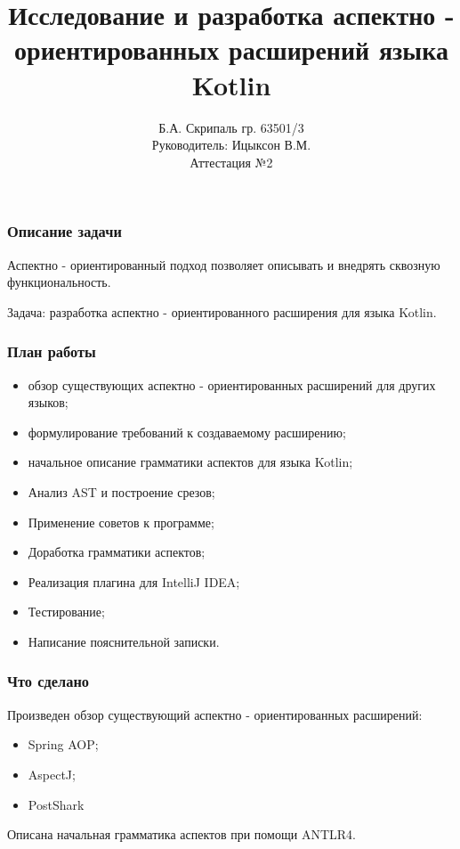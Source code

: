 \documentclass{beamer}
\begin{document}
	
	\title[Разработка АОП для Kotlin]
	{Исследование и разработка аспектно - ориентированных расширений языка 
	Kotlin}
	
	\author[Б.А. Скрипаль]{
		Б.А. Скрипаль гр. 63501/3\\
		Руководитель: Ицыксон В.М.\\
		Аттестация №2
	}
	\date[16.11.2016]{}  
	\frame{\titlepage} 
	
	\begin{frame}
		\frametitle{Описание задачи}
		Аспектно - ориентированный подход позволяет описывать и внедрять 
		сквозную функциональность.
		
		Задача: разработка аспектно - ориентированного расширения для языка 
		Kotlin.
	\end{frame}
	
	\begin{frame}
		\frametitle{План работы}
		\begin{itemize}
			\item [\checkmark] обзор существующих аспектно - ориентированных 
			расширений для других языков;
			\item [\checkmark] формулирование требований к создаваемому 
			расширению;
			\item [\checkmark] начальное описание грамматики аспектов для языка 
			Kotlin;
			\item Анализ AST и построение срезов;
			\item Применение советов к программе;
			\item Доработка грамматики аспектов;
			\item Реализация плагина для IntelliJ IDEA;
			\item Тестирование;
			\item Написание пояснительной записки.
		\end{itemize}
	\end{frame}
	
	\begin{frame}
		\frametitle{Что сделано}
		Произведен обзор существующий аспектно - ориентированных расширений:
		\begin{itemize}
			\item Spring AOP;
			\item AspectJ;
			\item PostShark
		\end{itemize}
		
		Описана начальная грамматика аспектов при помощи ANTLR4.
	\end{frame}
\end{document}
